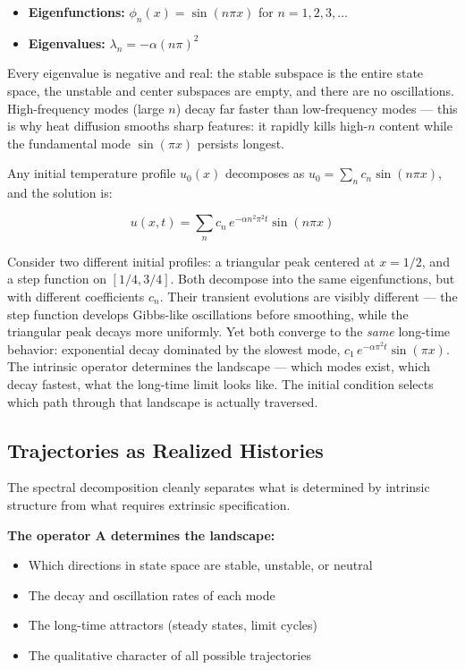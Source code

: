 \documentclass[
  letterpaper,
  DIV=11,
  numbers=noendperiod]{scrartcl}
\providecommand{\tightlist}{%
  \setlength{\itemsep}{0pt}\setlength{\parskip}{0pt}}
\begin{document}
\begin{itemize}
\tightlist
\item
  \textbf{Eigenfunctions:} \(\phi_n(x) = \sin(n\pi x)\) for
  \(n = 1, 2, 3, \ldots\)
\item
  \textbf{Eigenvalues:} \(\lambda_n = -\alpha(n\pi)^2\)
\end{itemize}

Every eigenvalue is negative and real: the stable subspace is the entire
state space, the unstable and center subspaces are empty, and there are
no oscillations. High-frequency modes (large \(n\)) decay far faster
than low-frequency modes --- this is why heat diffusion smooths sharp
features: it rapidly kills high-\(n\) content while the fundamental mode
\(\sin(\pi x)\) persists longest.

Any initial temperature profile \(u_0(x)\) decomposes as
\(u_0 = \sum_n c_n \sin(n\pi x)\), and the solution is:

\[u(x,t) = \sum_n c_n \, e^{-\alpha n^2 \pi^2 t} \sin(n\pi x)\]

Consider two different initial profiles: a triangular peak centered at
\(x = 1/2\), and a step function on \([1/4, 3/4]\). Both decompose into
the same eigenfunctions, but with different coefficients \(c_n\). Their
transient evolutions are visibly different --- the step function
develops Gibbs-like oscillations before smoothing, while the triangular
peak decays more uniformly. Yet both converge to the \emph{same}
long-time behavior: exponential decay dominated by the slowest mode,
\(c_1 \, e^{-\alpha\pi^2 t}\sin(\pi x)\). The intrinsic operator
determines the landscape --- which modes exist, which decay fastest,
what the long-time limit looks like. The initial condition selects which
path through that landscape is actually traversed.

\subsection{Trajectories as Realized
Histories}\label{trajectories-as-realized-histories}

The spectral decomposition cleanly separates what is determined by
intrinsic structure from what requires extrinsic specification.

\textbf{The operator \(\mathbf{A}\) determines the landscape:}

\begin{itemize}
\tightlist
\item
  Which directions in state space are stable, unstable, or neutral
\item
  The decay and oscillation rates of each mode
\item
  The long-time attractors (steady states, limit cycles)
\item
  The qualitative character of all possible trajectories
\end{itemize}
\end{document}
